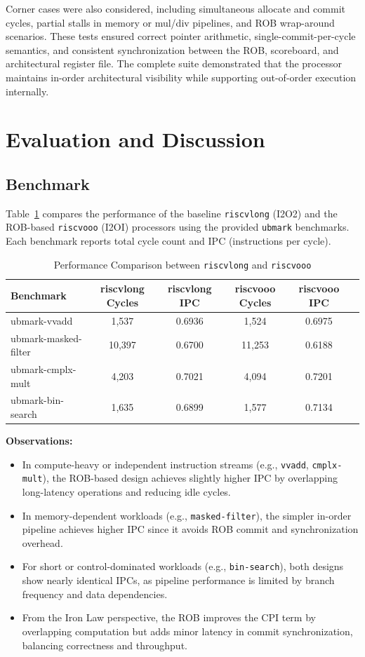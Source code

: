 \documentclass[11pt,a4paper]{article}
\begin{document}
Corner cases were also considered, including simultaneous allocate and commit cycles, partial stalls in memory or mul/div pipelines, and ROB wrap-around scenarios. These tests ensured correct pointer arithmetic, single-commit-per-cycle semantics, and consistent synchronization between the ROB, scoreboard, and architectural register file. The complete suite demonstrated that the processor maintains in-order architectural visibility while supporting out-of-order execution internally.

\section{Evaluation and Discussion}
\subsection{Benchmark}
Table~\ref{tab:perf} compares the performance of the baseline \texttt{riscvlong} (I2O2) and the ROB-based \texttt{riscvooo} (I2OI) processors using the provided \texttt{ubmark} benchmarks. Each benchmark reports total cycle count and IPC (instructions per cycle).

\begin{table}[H]
\centering
\caption{Performance Comparison between \texttt{riscvlong} and \texttt{riscvooo}}
\label{tab:perf}
\begin{tabular}{lccccc}
\toprule
\textbf{Benchmark} & \textbf{riscvlong Cycles} & \textbf{riscvlong IPC} & \textbf{riscvooo Cycles} & \textbf{riscvooo IPC}  \\
\midrule
ubmark-vvadd         & 1,537  & 0.6936 & 1,524  & 0.6975 \\
ubmark-masked-filter & 10,397 & 0.6700 & 11,253 & 0.6188  \\
ubmark-cmplx-mult    & 4,203  & 0.7021 & 4,094  & 0.7201 \\
ubmark-bin-search    & 1,635  & 0.6899 & 1,577  & 0.7134  \\
\end{tabular}
\end{table}

\noindent
\textbf{Observations:}
\begin{itemize}
  \item In compute-heavy or independent instruction streams (e.g., \texttt{vvadd}, \texttt{cmplx-mult}), the ROB-based design achieves slightly higher IPC by overlapping long-latency operations and reducing idle cycles.
  \item In memory-dependent workloads (e.g., \texttt{masked-filter}), the simpler in-order pipeline achieves higher IPC since it avoids ROB commit and synchronization overhead.
  \item For short or control-dominated workloads (e.g., \texttt{bin-search}), both designs show nearly identical IPCs, as pipeline performance is limited by branch frequency and data dependencies.
  \item From the Iron Law perspective, the ROB improves the CPI term by overlapping computation but adds minor latency in commit synchronization, balancing correctness and throughput.
\end{itemize}
\end{document}

